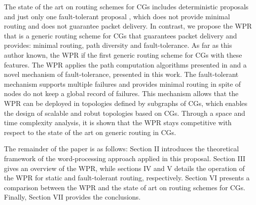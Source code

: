 The state of the art  on routing schemes for CGs includes deterministic proposals \cite{nets_cg_model,Camelo14} and just only one fault-tolerant proposal \cite{Tang92}, which does not provide minimal routing and does not guarantee packet delivery. In contrast, we propose the WPR that is a generic routing scheme for CGs that guarantees packet delivery and provides: minimal routing, path diversity and fault-tolerance. As far as this author known, the WPR if the first generic routing scheme for CGs with these features. The WPR applies the path computation algorithms presented in \cite{AGUIRREGUERRERO2019218} and a novel
mechanism of fault-tolerance, presented in this work. The fault-tolerant mechanism supports multiple failures and
provides minimal routing in spite of nodes do not keep a global
record of failures. This mechanism allows that the WPR can be deployed in topologies defined by subgraphs of CGs, which enables the design of scalable and robut topologies based on CGs.
Through a space and time complexity analysis, it
is shown that the WPR stays competitive with respect to the state
of the art on generic routing in CGs.  

The remainder of the paper is as follows: Section II introduces the theoretical framework of the word-processing approach applied in this proposal. Section III gives an overview of the WPR, while sections IV and V details the operation of the WPR for static and fault-tolerant routing, respectively. Section VI presents a comparison between the WPR and the state of art on routing schemes for CGs. Finally, Section VII provides the conclusions.